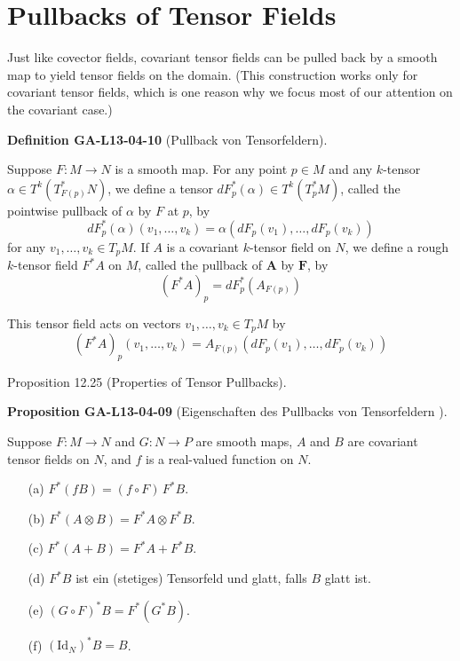 \documentclass[10pt, letterpaper]{article}
\newcommand{\CustomHeading}[3]{%
  \par\medskip\noindent%
  \textbf{#1 #2} \textnormal{(#3)}.\enskip%
}
\newenvironment{DEF}[2]{\begin{unitbox}\CustomHeading{Definition}{#1}{#2}}{\end{unitbox}}
\newenvironment{PROP}[2]{\begin{unitbox}\CustomHeading{Proposition}{#1}{#2}}{\end{unitbox}}
\begin{document}
\pagebreak


\section*{Pullbacks of Tensor Fields}


Just like covector fields, covariant tensor fields can be pulled back by a smooth map to yield tensor fields on the domain. (This construction works only for covariant tensor fields, which is one reason why we focus most of our attention on the covariant case.)

\begin{DEF}{GA-L13-04-10}{Pullback von Tensorfeldern}
Suppose $F: M \rightarrow N$ is a smooth map. For any point $p \in M$ and any $k$-tensor $\alpha \in T^{k}\left(T_{F(p)}^{*} N\right)$, we define a tensor $d F_{p}^{*}(\alpha) \in T^{k}\left(T_{p}^{*} M\right)$, called the pointwise pullback of $\alpha$ by $F$ at $p$, by
$$
d F_{p}^{*}(\alpha)\left(v_{1}, \ldots, v_{k}\right)=\alpha\left(d F_{p}\left(v_{1}\right), \ldots, d F_{p}\left(v_{k}\right)\right)
$$
for any $v_{1}, \ldots, v_{k} \in T_{p} M$. If $A$ is a covariant $k$-tensor field on $N$, we define a rough $k$-tensor field $F^{*} A$ on $M$, called the pullback of $\boldsymbol{A}$ by $\boldsymbol{F}$, by
$$
\left(F^{*} A\right)_{p}=d F_{p}^{*}\left(A_{F(p)}\right)
$$

This tensor field acts on vectors $v_{1}, \ldots, v_{k} \in T_{p} M$ by
$$
\left(F^{*} A\right)_{p}\left(v_{1}, \ldots, v_{k}\right)=A_{F(p)}\left(d F_{p}\left(v_{1}\right), \ldots, d F_{p}\left(v_{k}\right)\right)
$$
\end{DEF}


Proposition 12.25 (Properties of Tensor Pullbacks). 


\begin{PROP}{GA-L13-04-09}{Eigenschaften des Pullbacks von Tensorfeldern }
Suppose $F: M \rightarrow N$ and $G: N \rightarrow P$ are smooth maps, $A$ and $B$ are covariant tensor fields on $N$, and $f$ is a real-valued function on $N$.\\
\begin{itemize}
  \item[(a)] \( F^{*}(f B) = (f \circ F) \, F^{*} B \).
  \item[(b)] \( F^{*}(A \otimes B) = F^{*} A \otimes F^{*} B \).
  \item[(c)] \( F^{*}(A + B) = F^{*} A + F^{*} B \).
  \item[(d)] \( F^{*} B \) ist ein (stetiges) Tensorfeld und glatt, falls \( B \) glatt ist.
  \item[(e)] \( (G \circ F)^{*} B = F^{*}(G^{*} B) \).
  \item[(f)] \( (\mathrm{Id}_{N})^{*} B = B \).
\end{itemize}
\end{PROP}
\end{document}
